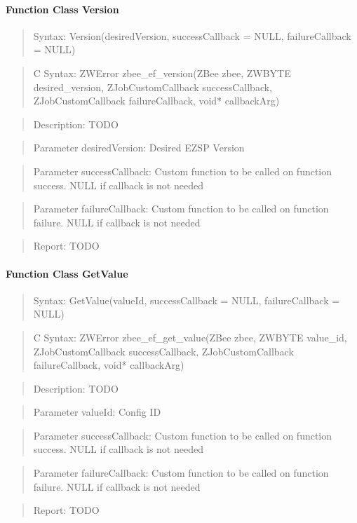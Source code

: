 
\paragraph{Function Class Version}
\begin{quote}Syntax: Version(desiredVersion, successCallback = NULL, failureCallback = NULL)\end{quote}
\begin{quote}C Syntax: ZWError zbee\_ef\_version(ZBee zbee, ZWBYTE desired\_version, ZJobCustomCallback successCallback, ZJobCustomCallback failureCallback, void* callbackArg)\end{quote}
\begin{quote}Description: TODO\end{quote}
\begin{quote}Parameter desiredVersion: Desired EZSP Version\end{quote}
\begin{quote}Parameter successCallback: Custom function to be called on function success. NULL if callback is not needed\end{quote}
\begin{quote}Parameter failureCallback: Custom function to be called on function failure. NULL if callback is not needed\end{quote}
\begin{quote}Report: TODO\end{quote}

\paragraph{Function Class GetValue}
\begin{quote}Syntax: GetValue(valueId, successCallback = NULL, failureCallback = NULL)\end{quote}
\begin{quote}C Syntax: ZWError zbee\_ef\_get\_value(ZBee zbee, ZWBYTE value\_id, ZJobCustomCallback successCallback, ZJobCustomCallback failureCallback, void* callbackArg)\end{quote}
\begin{quote}Description: TODO\end{quote}
\begin{quote}Parameter valueId: Config ID\end{quote}
\begin{quote}Parameter successCallback: Custom function to be called on function success. NULL if callback is not needed\end{quote}
\begin{quote}Parameter failureCallback: Custom function to be called on function failure. NULL if callback is not needed\end{quote}
\begin{quote}Report: TODO\end{quote}

